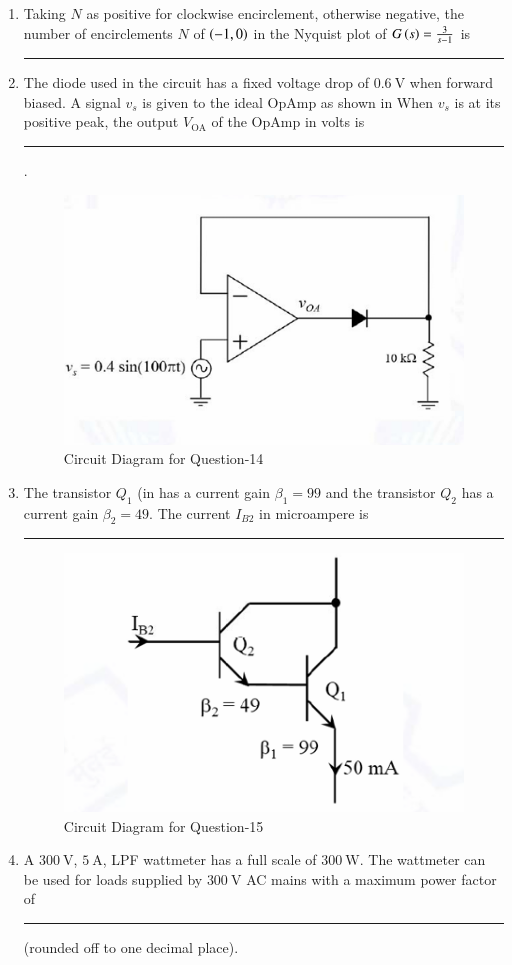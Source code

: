 \documentclass[journal,12pt,onecolumn]{IEEEtran}
\theoremstyle{remark}
\begin{document}
\begin{enumerate}
\item Taking $N$ as positive for clockwise encirclement, otherwise negative, the number of encirclements $N$ of $\left(-1,0\right)$ in the Nyquist plot of $G\left(s\right) = \frac{3}{s-1}$ is \rule{1.5cm}{0.4pt}   \par \hfill{}


\item The diode used in the circuit has a fixed voltage drop of $0.6\ \text{V}$ when forward biased. A signal $v_s$ is given to the ideal OpAmp as shown in  When $v_s$ is at its positive peak, the output $V_{\text{OA}}$ of the OpAmp in volts is \rule{1.5cm}{0.4pt}. \par \hfill{}
\begin{figure}[H]
    \centering
    \includegraphics[width=0.5\linewidth]{Figs/Q-14.png}
    \caption{Circuit Diagram for Question-14}
    \label{14}
\end{figure}

\item The transistor $Q_1$ (in  has a current gain $\beta_1 = 99$ and the transistor $Q_2$ has a current gain $\beta_2 = 49$. The current $I_{B2}$ in microampere is \rule{1.5cm}{0.4pt}  \par \hfill{}
\begin{figure}[H]
    \centering
    \includegraphics[width=0.5\linewidth]{Figs/Q-15.png}
    \caption{Circuit Diagram for Question-15}
    \label{15}
\end{figure}


\item A $300\ \text{V}$, $5\ \text{A}$, LPF wattmeter has a full scale of $300\ \text{W}$. 
The wattmeter can be used for loads supplied by $300\ \text{V}$ AC mains with a maximum power factor of 
\rule{1.5cm}{0.4pt} (rounded off to one decimal place). \par \hfill{}


\end{enumerate}
\end{document}
